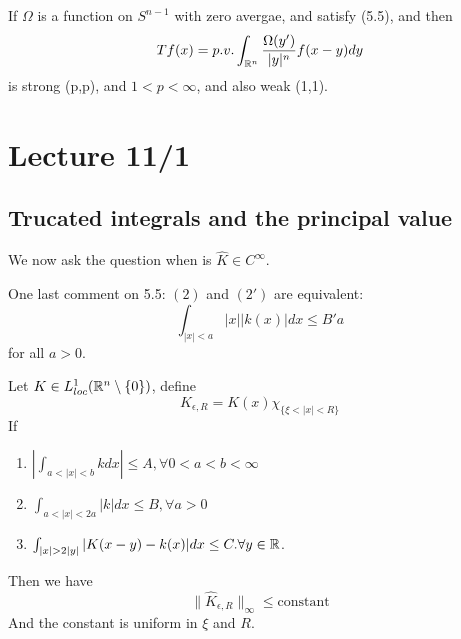 \begin{corollary}
    If $\Omega$ is a function on $S^{n-1}$ with zero avergae, and satisfy (5.5), and then
    \begin{equation*}
        Tf(x)=p.v.\int_{\mathbb{R}^n}\frac{\Omega(y')}{|y|^n}f(x-y)dy
    \end{equation*}
    is strong (p,p), and $1<p<\infty$, and also weak (1,1).
\end{corollary}




\section{Lecture 11/1}
\subsection{Trucated integrals and the principal value}
We now ask the question when is $\widehat{K}\in C^\infty$.

One last comment on 5.5: $(2)$ and $(2')$ are equivalent:
\begin{equation*}
    \int_{|x|<a}|x||k(x)|dx\leq B'a
\end{equation*}
for all $a>0$.

\begin{proposition}
    Let $K\in L_{loc}^1(\mathbb{R}^n\setminus\{0\})$, define 
    \begin{equation*}
        K_{\epsilon, R}=K(x)\chi_{\{\xi<|x|<R\}}
    \end{equation*}
    If 
    \begin{enumerate}
        \item $\left|\int_{a<|x|<b}kdx\right|\leq A, \forall 0<a<b<\infty$
        \item $\int_{a<|x|<2a}|k|dx\leq B, \forall a>0$
        \item $\int_{|x|>2|y|}|K(x-y)-k(x)|dx\leq C. \forall y\in\R$.
    \end{enumerate}
    Then we have
    \begin{equation*}
        \|\widehat{K}_{\epsilon, R}\|_\infty\leq \text{constant}
    \end{equation*}
    And the constant is uniform in $\xi$ and $R$.
\end{proposition}

